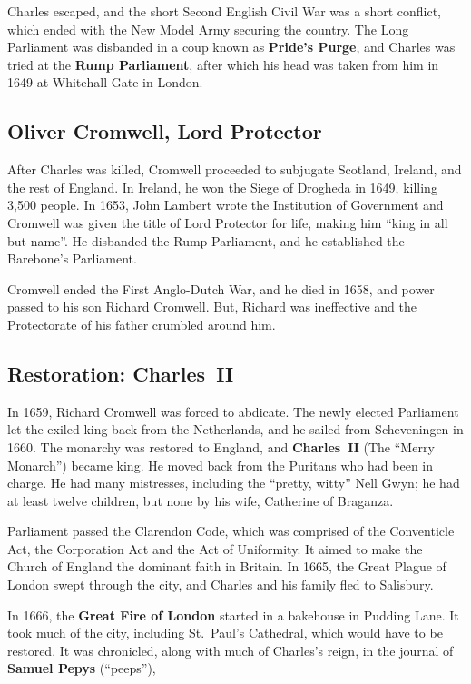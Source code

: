 Charles escaped, and the short Second English Civil War was a short conflict,
which ended with the New Model Army securing the country.
The Long Parliament was disbanded in a coup known as \textbf{Pride's Purge},
and Charles was tried at the \textbf{Rump Parliament},
after which his head was taken from him in 1649 at Whitehall Gate in London.

\subsection*{Oliver Cromwell, Lord Protector}

After Charles was killed, Cromwell proceeded to subjugate Scotland, Ireland, and the rest of England.
In Ireland, he won the Siege of Drogheda in 1649, killing 3,500 people.
In 1653, John Lambert wrote the Institution of Government
and Cromwell was given the title of Lord Protector for life,
making him ``king in all but name''.
He disbanded the Rump Parliament, and he established the Barebone's Parliament.

Cromwell ended the First Anglo-Dutch War, and he died in 1658,
and power passed to his son Richard Cromwell.
But, Richard was ineffective and the Protectorate of his father crumbled around him.

\subsection*{Restoration: Charles~II}

In 1659, Richard Cromwell was forced to abdicate.
The newly elected Parliament let the exiled king back from the Netherlands,
and he sailed from Scheveningen in 1660.
The monarchy was restored to England, and \textbf{Charles~II} (The ``Merry Monarch'') became king.
He moved back from the Puritans who had been in charge.
He had many mistresses, including the ``pretty, witty'' Nell Gwyn;
he had at least twelve children, but none by his wife, Catherine of Braganza.

Parliament passed the Clarendon Code, which was comprised of
the Conventicle Act,
the Corporation Act
and the Act of Uniformity.
It aimed to make the Church of England the dominant faith in Britain.
In 1665, the Great Plague of London swept through the city,
and Charles and his family fled to Salisbury.

In 1666, the \textbf{Great Fire of London} started in a bakehouse in Pudding Lane.
It took much of the city, including St.\ Paul's Cathedral, which would have to be restored.
It was chronicled, along with much of Charles's reign,
in the journal of \textbf{Samuel Pepys} (``peeps''),

